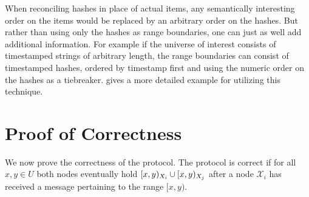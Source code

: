 When reconciling hashes in place of actual items, any semantically interesting order on the items would be replaced by an arbitrary order on the hashes. But rather than using only the hashes as range boundaries, one can just as well add additional information. For example if the universe of interest consists of timestamped strings of arbitrary length, the range boundaries can consist of timestamped hashes, ordered by timestamp first and using the numeric order on the hashes as a tiebreaker.  gives a more detailed example for utilizing this technique.

\section{Proof of Correctness}
\label{set-reconciliation-simple-correct}

\newcommand{\intcount}[1]{\mathit{count}_{#1}}

We now prove the correctness of the protocol. The protocol is correct if for all $x, y \in U$ both nodes eventually hold $[{x},{y})_{X_i} \cup [{x},{y})_{X_j}$ after a node $\mathcal{X}_i$ has received a message pertaining to the range $[x, y)$.

